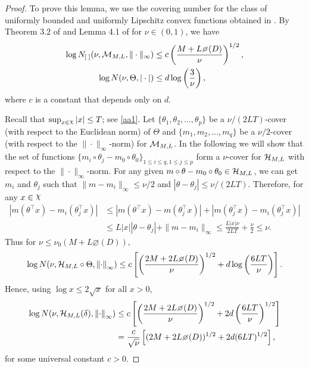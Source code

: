 \begin{proof}
To prove this lemma, we use the covering number for the class of uniformly bounded and uniformly Lipschitz convex functions obtained in \cite{ADBO}.
By Theorem 3.2 of \cite{ADBO} and Lemma 4.1 of \cite{Pollard90} for $\nu \in (0,1)$,  we have
\begin{align}\label{eq:entoprY_ind_lip}
\log N_{[\;]}(\nu,\M_{M,L},\|\cdot\|_{\infty})&\le c\left(\frac{M+L\diameter(D)}{\nu}\right)^{1/2},\\
\log N(\nu,\Theta,|\cdot|)&\le d \log\left(\frac{3}{\nu}\right),
\end{align}
where $c$ is a constant that depends only on $d.$

Recall that $\sup_{x\in\rchi} |x| \le T$; see \ref{aa1}. Let $\{\theta_1,\theta_2,\ldots,\theta_p\}$ be a $\nu/(2LT)$-cover (with respect to the Euclidean norm) of $\Theta$ and $\{m_1,m_2,\ldots,m_q\}$ be a $\nu/2$-cover (with respect to the $\|\cdot\|_\infty$-norm) for $\mathcal{M}_{M,L}$. In the following we will show that the set of functions $\{m_i\circ\theta_j-m_0\circ\theta_0\}_{1\le i\le q, 1\le j\le p}$ form a $\nu$-cover for $\mathcal{H}_{M,L}$ with respect to the $\|\cdot\|_{\infty}$-norm. For any given $m\circ\theta-m_0\circ\theta_0\in\mathcal{H}_{M,L}$, we can get $m_i$ and $\theta_j$ such that $\|m-m_i\|_{\infty} \le \nu/2$ and $|\theta - \theta_j| \le \nu/(2LT).$ Therefore, for any $x\in\rchi$
\begin{align*}
|m(\theta^{\top}x) - m_i(\theta_j^{\top}x)|&\le|m(\theta^{\top}x) - m(\theta_j^{\top}x)| + |m(\theta_j^{\top}x) - m_i(\theta_j^{\top}x)|\\
&\le L|x||\theta - \theta_j| + \|m - m_i\|_{\infty} \le \frac{L|x|\nu}{2LT}+\frac{\nu}{2} \le \nu.
\end{align*}
Thus for $\nu \le \nu_0(M + L\diameter(D)),$
\[
\log N(\nu, \mathcal{H}_{M,L}\circ\Theta, \norm{\cdot}_{\infty}) \le c\left[\left(\frac{2M + 2L\diameter(D)}{\nu}\right)^{1/2} + d\log\left(\frac{6LT}{\nu}\right)\right].
\]
Hence, using $\log x\le 2\sqrt{x}$ for all $x > 0$,
\begin{align*}
\log N(\nu, \mathcal{H}_{M,L}(\delta), \norm{\cdot}_{\infty}) &\le c\left[\left(\frac{2M + 2L\diameter(D)}{\nu}\right)^{1/2} + 2d\left(\frac{6LT}{\nu}\right)^{1/2}\right]\\
&= \frac{c}{\sqrt{\nu}}\left[(2M + 2L\diameter(D))^{1/2} + 2d(6LT)^{1/2}\right],
\end{align*}
for some universal constant $c> 0$.
\end{proof}
